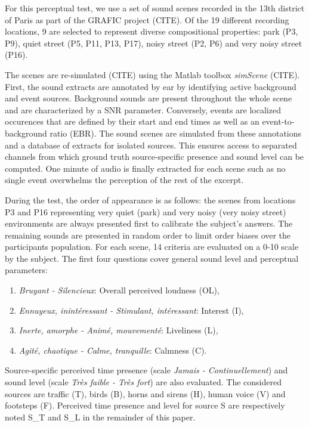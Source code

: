 \documentclass{article}
\begin{document}
\begin{sloppy}
For this perceptual test, we use a set of sound scenes recorded in the 13th district of Paris as part of the GRAFIC project (CITE). Of the 19 different recording locations, 9 are selected to represent diverse compositional properties: park (P3, P9), quiet street (P5, P11, P13, P17), noisy street (P2, P6) and very noisy street (P16).

The scenes are re-simulated (CITE) using the Matlab toolbox \textit{simScene} (CITE). First, the sound extracts are annotated by ear by identifying active background and event sources. Background sounds are present throughout the whole scene and are characterized by a SNR parameter. Conversely, events are localized occurences that are defined by their start and end times as well as an event-to-background ratio (EBR). The sound scenes are simulated from these annotations and a database of extracts for isolated sources. This ensures access to separated channels from which ground truth source-specific presence and sound level can be computed. One minute of audio is finally extracted for each scene such as no single event overwhelms the perception of the rest of the excerpt.

During the test, the order of appearance is as follows: the scenes from locations P3 and P16 representing very quiet (park) and very noisy (very noisy street) environments are always presented first to calibrate the subject's answers. The remaining sounds are presented in random order to limit order biases over the participants population. For each scene, 14 criteria are evaluated on a 0-10 scale by the subject. The first four questions cover general sound level and perceptual parameters:
\begin{enumerate}
\item \textit{Bruyant - Silencieux}: Overall perceived loudness (OL),
\item \textit{Ennuyeux, inint\'eressant - Stimulant, int\'eressant}: Interest (I),
\item \textit{Inerte, amorphe - Anim\'e, mouvement\'e}: Liveliness (L),
\item \textit{Agit\'e, chaotique - Calme, tranquille}: Calmness (C).
\end{enumerate}
Source-specific perceived time presence (scale \textit{Jamais - Continuellement}) and sound level (scale \textit{Tr\`es faible - Tr\`es fort}) are also evaluated. The considered sources are traffic (T), birds (B), horns and sirens (H), human voice (V) and footsteps (F). Perceived time presence and level for source S are respectively noted S\_T and S\_L in the remainder of this paper.


\end{sloppy}
\end{document}
